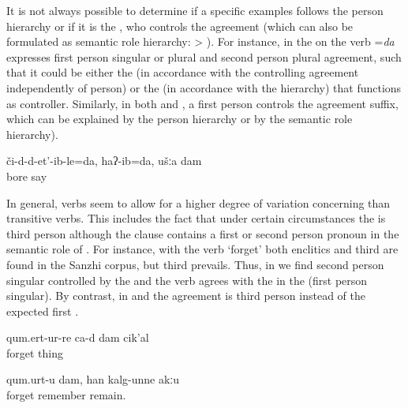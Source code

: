 It is not always possible to determine if a specific examples follows the person hierarchy or if it is the , who controls the agreement (which can also be formulated as semantic role hierarchy:  > ). For instance, in  the   on the verb =\textit{da} expresses first person singular or plural and second person plural agreement, such that it could be either the  (in accordance with the  controlling agreement independently of person) or the  (in accordance with the hierarchy) that functions as controller. Similarly, in both  and , a first person  controls the agreement suffix, which can be explained by the person hierarchy or by the semantic role hierarchy). 


\begin{exe}
	\ex	\label{ex:You (pl.) bored me, I said}
	\gll	či-d-d-et'-ib-le=da,	haʔ-ib=da,	ušːa	dam\\
		bore	say		\\
	\glt	{}
\end{exe}


In general,  verbs seem to allow for a higher degree of variation concerning  than transitive verbs. This includes the fact that under certain circumstances the  is third person although the clause contains a first or second person  pronoun in the semantic role of . For instance, with the verb `forget' both  enclitics and third  are found in the Sanzhi corpus, but third  prevails. Thus, in  we find second person singular controlled by the  and  the verb agrees with the  in the  (first person singular). By contrast, in  and  the agreement is third person instead of the expected first . 
%

\begin{exe}
	\ex	\label{ex:I forgot everythingA}
	\gll	qum.ert-ur-re	ca-d	dam	cik'al\\
		forget			thing\\
	\glt	{}
	
		\ex	\label{ex:I forget (it), I do not remember it.}
	\gll	qum.urt-u dam, han kalg-unne akːu\\
		forget		remember remain. \\
	\glt	{}
	
\end{exe}

